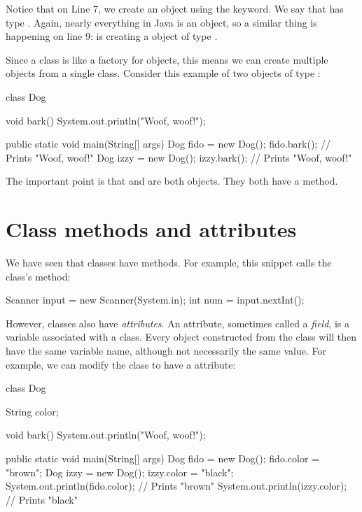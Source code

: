 Notice that on Line 7, we create an object  using the  keyword. We say that  has type . Again, nearly everything in Java is an object, so a similar thing is happening on line 9:  is creating a  object of type .

Since a class is like a factory for objects, this means we can create multiple objects from a single class. Consider this example of two objects of type :

\begin{code}
class Dog {

    void bark() {
        System.out.println("Woof, woof!");
    }
    
    public static void main(String[] args) {
        Dog fido = new Dog();
        fido.bark();  // Prints "Woof, woof!"
        Dog izzy = new Dog();
        izzy.bark();  // Prints "Woof, woof!"
    }
}
\end{code}

The important point is that  and  are both  objects. They both have a  method.

\section{Class methods and attributes}

We have seen that classes have methods. For example, this snippet calls the  class's  method:

\begin{code}
Scanner input = new Scanner(System.in);
int num = input.nextInt();
\end{code}

However, classes also have \emph{attributes}. An attribute, sometimes called a \emph{field}, is a variable associated with a class. Every object constructed from the class will then have the same variable name, although not necessarily the same value. For example, we can modify the  class to have a  attribute:

\begin{code}
class Dog {

    String color;

    void bark() {
        System.out.println("Woof, woof!");
    }
    
    public static void main(String[] args) {
        Dog fido = new Dog();
        fido.color = "brown";
        Dog izzy = new Dog();
        izzy.color = "black";
        System.out.println(fido.color);  // Prints "brown"
        System.out.println(izzy.color);  // Prints "black"
    }
}
\end{code}

